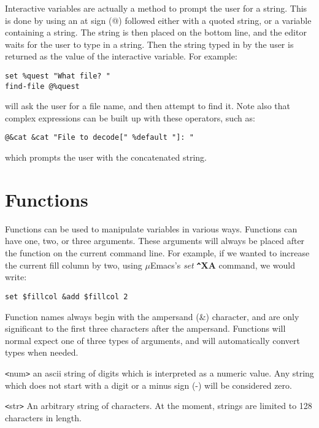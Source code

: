 Interactive variables are actually a method to prompt the user for a
string. This is done by using an at sign (@) followed either with a
quoted string, or a variable containing a string. The string is then
placed on the bottom line, and the editor waits for the user to type in
a string. Then the string typed in by the user is returned as the
value of the interactive variable. For example:

\begin{verbatim}
set %quest "What file? "
find-file @%quest
\end{verbatim}

will ask the user for a file name, and then attempt to find it. Note
also that complex expressions can be built up with these operators,
such as:

\begin{verbatim}
@&cat &cat "File to decode[" %default "]: "
\end{verbatim}

which prompts the user with the concatenated string.

\section{Functions}

Functions can be used to manipulate variables in various ways.
Functions can have one, two, or three arguments. These arguments will
always be placed after the function on the current command line. For
example, if we wanted to increase the current fill column by two, using
$\mu$Emacs's {\it set} {\bf \verb+^+XA} command, we would write:

\begin{verbatim}
set $fillcol &add $fillcol 2
\end{verbatim}

Function names always begin with the ampersand (\&) character, and are
only significant to the first three characters after the ampersand.
Functions will normal expect one of three types of arguments, and will
automatically convert types when needed.

\verb+<+num\verb+>+ an ascii string of digits which is interpreted as a
numeric value. Any string which does not start with a digit or a minus
sign (-) will be considered zero.

\verb+<+str\verb+>+ An arbitrary string of characters. At the moment,
strings are limited to 128 characters in length.

